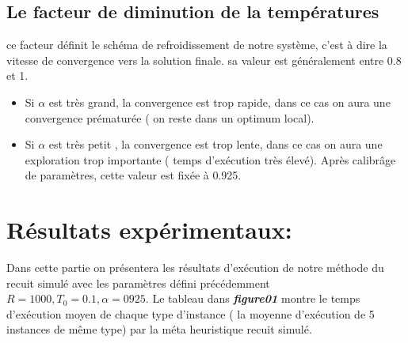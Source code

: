 \documentclass[12pt]{article}
\begin{document}
\subsection{Le facteur de diminution de la températures}
ce facteur définit le schéma de refroidissement de notre système, c’est à dire la vitesse de convergence vers la solution finale.  sa valeur est généralement  entre 0.8 et 1.
\begin{itemize}
    \item Si $ \alpha $ est très grand, la convergence est trop rapide, dans ce cas on aura une convergence prématurée ( on reste dans un optimum local).
    \item Si $ \alpha $ est très petit , la convergence est trop lente, dans ce cas on aura une exploration trop importante ( temps d'exécution très élevé).
Après calibrâge de paramètres, cette valeur est fixée à 0.925.    
\end{itemize}

\section{Résultats expérimentaux: }
Dans cette partie on présentera les résultats d'exécution de notre méthode du recuit simulé avec les paramètres défini précédemment \textbf{$R=1000,T_{0}=0.1,\alpha =0925$}.
Le tableau dans \textbf{ \emph{figure01} } montre le temps d'exécution moyen de chaque type d’instance 
( la moyenne d'exécution de 5 instances de même type)  par la méta heuristique recuit simulé.
\end{document}
